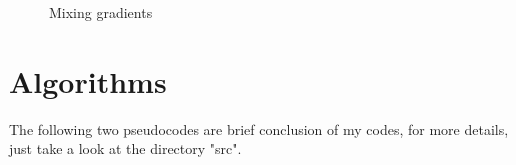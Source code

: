 \documentclass[11pt]{article}
\begin{document}
	\begin{figure}[H]
		\centering
		
		\caption{Mixing gradients}
	\end{figure}

\section{Algorithms}
	
	The following two pseudocodes are brief conclusion of my codes, for more details, just take a look at the directory "src".
	
\end{document}
